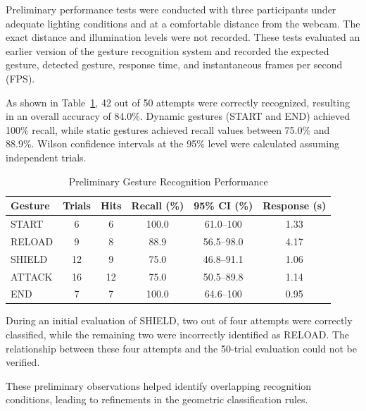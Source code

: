 \documentclass[lettersize,journal]{IEEEtran}
\begin{document}
	Preliminary performance tests
	were conducted with three participants under adequate lighting
	conditions and at a comfortable distance from the webcam.
	The exact distance and illumination levels were not recorded.
	These tests evaluated an earlier version of the gesture
	recognition system and recorded the expected gesture, detected
	gesture, response time, and instantaneous frames per second
	(FPS).

	As shown in
	Table~\ref{tab:gesture_benchmark}, 42 out of 50 attempts were
	correctly recognized, resulting in an overall accuracy of
	84.0\%. Dynamic gestures (START and END) achieved 100\%
	recall, while static gestures achieved recall values between
	75.0\% and 88.9\%. Wilson confidence intervals at the 95\%
	level were calculated assuming independent trials.

	\begin{table}[!t]
		\centering
		\caption{Preliminary Gesture Recognition Performance}
		\label{tab:gesture_benchmark}
		\scriptsize
		\setlength{\tabcolsep}{3pt}
		\renewcommand{\arraystretch}{1.1}
		\begin{tabular}{@{}l c c c c c@{}}
			\toprule
			\textbf{Gesture} &
			\textbf{Trials} &
			\textbf{Hits} &
			\textbf{Recall (\%)} &
			\textbf{95\% CI (\%)} &
			\textbf{Response (s)} \\
			\midrule
			START  & 6  & 6  & 100.0 & 61.0--100 & 1.33 \\
			RELOAD & 9  & 8  & 88.9  & 56.5--98.0 & 4.17 \\
			SHIELD & 12 & 9  & 75.0  & 46.8--91.1 & 1.06 \\
			ATTACK & 16 & 12 & 75.0  & 50.5--89.8 & 1.14 \\
			END    & 7  & 7  & 100.0 & 64.6--100 & 0.95 \\
			\bottomrule
		\end{tabular}
	\end{table}

	During an initial evaluation of
	SHIELD, two out of four attempts were correctly classified,
	while the remaining two were incorrectly identified as RELOAD.
	The relationship between these four attempts and the 50-trial
	evaluation could not be verified.

	These preliminary observations
	helped identify overlapping recognition conditions, leading
	to refinements in the geometric classification rules.
\end{document}
